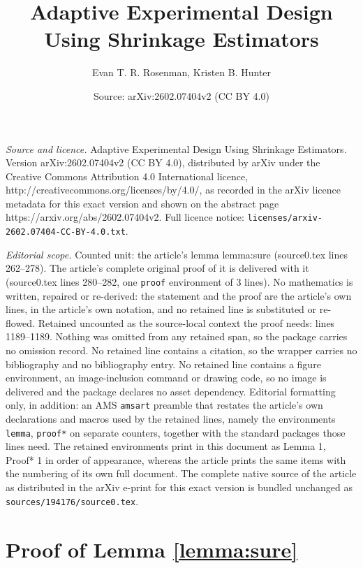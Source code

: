 \documentclass[10pt,a4paper]{amsart}
\title{Adaptive Experimental Design Using Shrinkage Estimators}
\author{Evan T. R. Rosenman, Kristen B. Hunter}
\date{Source: arXiv:2602.07404v2 (CC BY 4.0)}
\begin{document}
\maketitle

\noindent\emph{Source and licence.} Adaptive Experimental Design Using Shrinkage Estimators. Version arXiv:2602.07404v2 (CC BY 4.0), distributed by arXiv under the Creative Commons Attribution 4.0 International licence, http://creativecommons.org/licenses/by/4.0/, as recorded in the arXiv licence metadata for this exact version and shown on the abstract page https://arxiv.org/abs/2602.07404v2. Full licence notice: \texttt{licenses/arxiv-2602.07404-CC-BY-4.0.txt}.\par\smallskip

\noindent\textit{Editorial scope.} Counted unit: the article's lemma lemma:sure (source0.tex lines 262--278). The article's complete original proof of it is delivered with it (source0.tex lines 280--282, one \texttt{proof} environment of 3 lines). No mathematics is written, repaired or re-derived: the statement and the proof are the article's own lines, in the article's own notation, and no retained line is substituted or re-flowed.  Retained uncounted as the source-local context the proof needs: lines 1189--1189.  Nothing was omitted from any retained span, so the package carries no omission record.  No retained line contains a citation, so the wrapper carries no bibliography and no bibliography entry.  No retained line contains a figure environment, an image-inclusion command or drawing code, so no image is delivered and the package declares no asset dependency.  Editorial formatting only, in addition: an AMS \texttt{amsart} preamble that restates the article's own declarations and macros used by the retained lines, namely the environments \texttt{lemma}, \texttt{proof*} on separate counters, together with the standard packages those lines need.  The retained environments print in this document as Lemma 1, Proof* 1 in order of appearance, whereas the article prints the same items with the numbering of its own full document.  The complete native source of the article as distributed in the arXiv e-print for this exact version is bundled unchanged as \texttt{sources/194176/source0.tex}.
\section{Proof of Lemma \ref{lemma:sure}}\label{sec:proofSureLemma}
\end{document}
